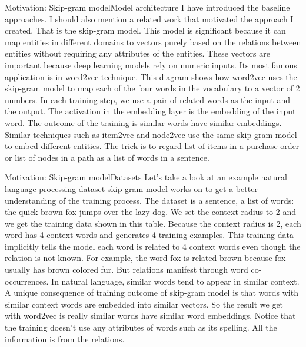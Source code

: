 \documentclass{beamer}
\begin{document}
\begin{frame}{Motivation: Skip-gram model}{Model architecture}
I have introduced the baseline approaches. I should also mention a related work that motivated the approach I created. That is the skip-gram model. This model is significant because it can map entities in different domains to vectors purely based on the relations between entities without requiring any attributes of the entities. These vectors are important because deep learning models rely on numeric inputs. Its most famous application is in word2vec technique. This diagram shows how word2vec uses the skip-gram model to map each of the four words in the vocabulary to a vector of 2 numbers. In each training step, we use a pair of related words as the input and the output. The activation in the embedding layer is the embedding of the input word. The outcome of the training is similar words have similar embeddings. Similar techniques such as item2vec and node2vec use the same skip-gram model to embed different entities. The trick is to regard list of items in a purchase order or list of nodes in a path as a list of words in a sentence.
\end{frame}

\begin{frame}{Motivation: Skip-gram model}{Datasets}
Let's take a look at an example natural language processing dataset skip-gram model works on to get a better understanding of the training process. The dataset is a sentence, a list of words: the quick brown fox jumps over the lazy dog. We set the context radius to 2 and we get the training data shown in this table. Because the context radius is 2, each word has 4 context words and generates 4 training examples. This training data implicitly tells the model each word is related to 4 context words even though the relation is not known. For example, the word fox is related brown because fox usually has brown colored fur. But relations manifest through word co-occurrences. In natural language, similar words tend to appear in similar context. A unique consequence of training outcome of skip-gram model is that words with similar context words are embedded into similar vectors. So the result we get with word2vec is really similar words have similar word embeddings. Notice that the training doesn't use any attributes of words such as its spelling. All the information is from the relations.
\end{frame}
\end{document}
